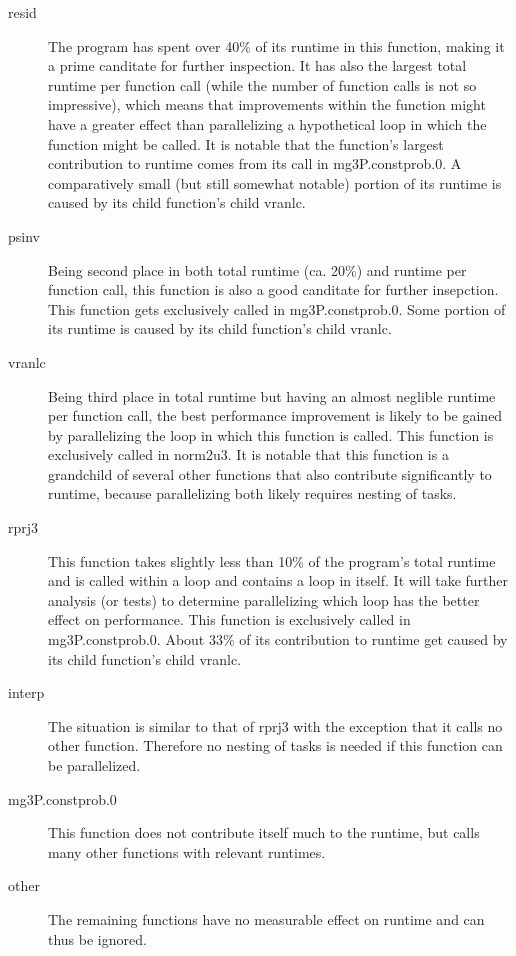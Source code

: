 \documentclass[parskip]{scrartcl}
\begin{document}
	\begin{description}
		\item[resid] The program has spent over 40\% of its runtime in this function, making it a prime canditate for further inspection. It has also the largest total runtime per function call (while the number of function calls is not so impressive), which means that improvements within the function might have a greater effect than parallelizing a hypothetical loop in which the function might be called. It is notable that the function's largest contribution to runtime comes from its call in mg3P.constprob.0. A comparatively small (but still somewhat notable) portion of its runtime is caused by its child function's child vranlc.
		
		\item[psinv] Being second place in both total runtime (ca. 20\%) and runtime per function call, this function is also a good canditate for further insepction. This function gets exclusively called in mg3P.constprob.0. Some portion of its runtime is caused by its child function's child vranlc.
		
		\item[vranlc] Being third place in total runtime but having an almost neglible runtime per function call, the best performance improvement is likely to be gained by parallelizing the loop in which this function is called. This function is exclusively called in norm2u3. It is notable that this function is a grandchild of several other functions that also contribute significantly to runtime, because parallelizing both likely requires nesting of tasks.
		
		\item[rprj3] This function takes slightly less than 10\% of the program's total runtime and is called within a loop and contains a loop in itself. It will take further analysis (or tests) to determine parallelizing which loop has the better effect on performance. This function is exclusively called in mg3P.constprob.0. About  33\% of its contribution to runtime get caused by its child function's child vranlc.
		
		\item[interp] The situation is similar to that of rprj3 with the exception that it calls no other function. Therefore no nesting of tasks is needed if this function can be parallelized.
		
		\item[mg3P.constprob.0] This function does not contribute itself much to the runtime, but calls many other functions with relevant runtimes.
		
		\item[other] The remaining functions have no measurable effect on runtime and can thus be ignored.
	\end{description}
	
\end{document}
